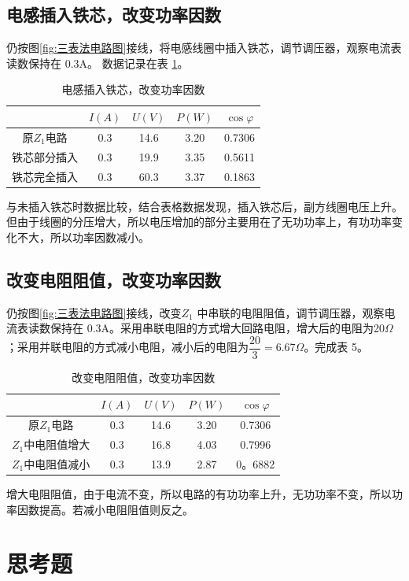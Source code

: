 \documentclass{ctexart}
\begin{document}
\subsection{电感插入铁芯，改变功率因数}
仍按图\ref{fig:三表法电路图}接线，将电感线圈中插入铁芯，调节调压器，观察电流表读数保持在 0.3A。
数据记录在表 \ref{tab:电感插入铁芯，改变功率因数}。
\begin{table}[!ht]
    \centering
    \begin{tabular}{|c|c|c|c|c|}
    \hline
        ~& $I(A)$ & $U(V)$ &$P(W)$ &$\cos\varphi$  \\ \hline
        原$Z_1$电路&0.3&14.6&3.20&0.7306\\ \hline 
        铁芯部分插入 & 0.3&19.9&3.35&0.5611\\\hline
    铁芯完全插入 & 0.3&60.3&3.37&0.1863\\\hline
    \end{tabular}
    \caption{电感插入铁芯，改变功率因数}
    \label{tab:电感插入铁芯，改变功率因数}
\end{table}
与未插入铁芯时数据比较，结合表格数据发现，插入铁芯后，副方线圈电压上升。但由于线圈的分压增大，所以电压增加的部分主要用在了无功功率上，有功功率变化不大，所以功率因数减小。
\subsection{改变电阻阻值，改变功率因数}
仍按图\ref{fig:三表法电路图}接线，改变$ Z_1$ 中串联的电阻阻值，调节调压器，观察电流表读数保持在 0.3A。采用串联电阻的方式增大回路电阻，增大后的电阻为20$\Omega$；采用并联电阻的方式减小电阻，减小后的电阻为$\dfrac{20}{3}=6.67\Omega$。完成表 5。
\begin{table}[!ht]
    \centering
    \begin{tabular}{|c|c|c|c|c|}
    \hline
        ~& $I(A)$ & $U(V)$ &$P(W)$ &$\cos\varphi$  \\ \hline
        原$Z_1$电路&0.3&14.6&3.20&0.7306\\ \hline 
        $Z_1$中电阻值增大 &0.3&16.8&4.03&0.7996\\\hline
     $Z_1$中电阻值减小 & 0.3&13.9&2.87&0。6882\\\hline
    \end{tabular}
    \caption{改变电阻阻值，改变功率因数}
    \label{tab:改变电阻阻值，改变功率因数}
\end{table}
增大电阻阻值，由于电流不变，所以电路的有功功率上升，无功功率不变，所以功率因数提高。若减小电阻阻值则反之。

\section{思考题}
\end{document}
